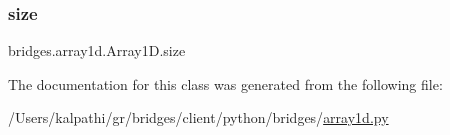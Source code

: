 \subsubsection{\texorpdfstring{size}{size}}
{\footnotesize\ttfamily bridges.\+array1d.\+Array1\+D.\+size}



The documentation for this class was generated from the following file\+:\begin{DoxyCompactItemize}
\item 
/\+Users/kalpathi/gr/bridges/client/python/bridges/\mbox{\hyperlink{array1d_8py}{array1d.\+py}}\end{DoxyCompactItemize}
